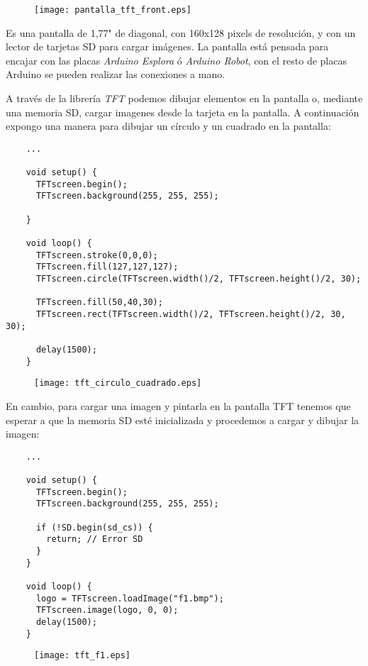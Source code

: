 \begin{figure}[h!]
    \centering
    \texttt{[image: pantalla\_tft\_front.eps]}
    \label{fig:arduino-ide}
\end{figure}



Es una pantalla de 1,77" de diagonal, con 160x128 pixels de resolución, y con un lector de tarjetas SD para cargar imágenes. La pantalla está pensada para encajar con las placas \emph{Arduino Esplora} ó \emph{Arduino Robot}, con el resto de placas Arduino se pueden realizar las conexiones a mano.

A través de la librería \emph{TFT} podemos dibujar elementos en la pantalla o, mediante una memoria SD, cargar imagenes desde la tarjeta en la pantalla. A continuación expongo una manera para dibujar un círculo y un cuadrado en la pantalla:

\begin{lstlisting}
    ...

    void setup() {
      TFTscreen.begin();
      TFTscreen.background(255, 255, 255);

    }

    void loop() {
      TFTscreen.stroke(0,0,0);
      TFTscreen.fill(127,127,127);
      TFTscreen.circle(TFTscreen.width()/2, TFTscreen.height()/2, 30);

      TFTscreen.fill(50,40,30);
      TFTscreen.rect(TFTscreen.width()/2, TFTscreen.height()/2, 30, 30);

      delay(1500);
    }
\end{lstlisting}

\begin{figure}[h!]
    \centering
    \texttt{[image: tft\_circulo\_cuadrado.eps]}
    \label{fig:arduino-ide}
\end{figure}

En cambio, para cargar una imagen y pintarla en la pantalla TFT tenemos que esperar a que la memoria SD esté inicializada y procedemos a cargar y dibujar la imagen:

\begin{lstlisting}
    ...

    void setup() {
      TFTscreen.begin();
      TFTscreen.background(255, 255, 255);

      if (!SD.begin(sd_cs)) {
        return; // Error SD
      }
    }

    void loop() {
      logo = TFTscreen.loadImage("f1.bmp");
      TFTscreen.image(logo, 0, 0);
      delay(1500);
    }
\end{lstlisting}

\begin{figure}[h!]
    \centering
    \texttt{[image: tft\_f1.eps]}
    \label{fig:arduino-ide}
\end{figure}